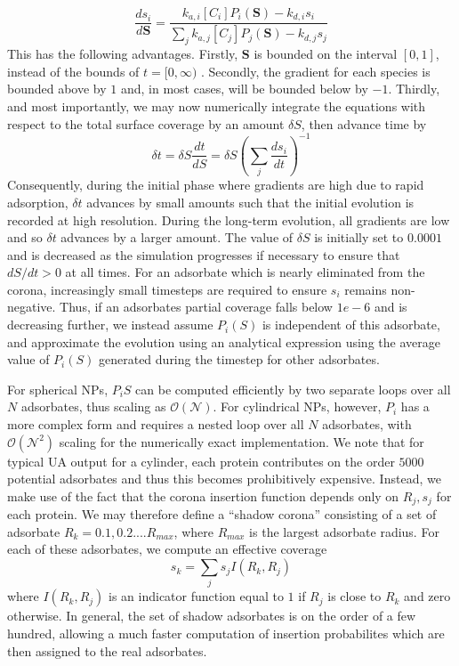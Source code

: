 \documentclass[10pt,a4paper,onecolumn]{report}
\begin{document}
\begin{equation}
\frac{ d s_i}{d \mathbf{S} } =\frac{  k_{a,i} [C_i] P_i(\mathbf{S}) - k_{d,i} s_i }{  \sum_j  k_{a,j} [C_j] P_j(\mathbf{S}) - k_{d,j} s_j  }
\end{equation}
This has the following advantages. Firstly, $\mathbf{S}$ is bounded on the interval $[0,1]$, instead of the bounds of $t = [0,\infty)$ . Secondly, the gradient for each species is bounded above by $1$ and, in most cases, will be bounded below by $-1$. Thirdly, and most importantly, we may now numerically integrate the equations with respect to the total surface coverage by an amount $\delta S$, then advance time by
\begin{equation}
\delta t = \delta S \frac{d t}{d S} = \delta S \left(  \sum_j \frac{d s_i}{dt}  \right)^{-1}
\end{equation}
Consequently, during the initial phase where gradients are high due to rapid adsorption, $\delta t$ advances by small amounts such that the initial evolution is recorded at high resolution. During the long-term evolution, all gradients are low and so $\delta t$ advances by a larger amount. The value of $\delta S$ is initially set to $0.0001$ and is decreased as the simulation progresses if necessary to ensure that $dS/dt > 0$ at all times. 
For an adsorbate which is nearly eliminated from the corona, increasingly small timesteps are required to ensure $s_i$ remains non-negative. Thus, if an adsorbates partial coverage falls below $1e-6$ and is decreasing further, we instead assume $P_i(S)$ is independent of this adsorbate, and approximate the evolution using an analytical expression using the average value of $P_i(S)$ generated during the timestep for other adsorbates.


For spherical NPs, $P_i{S}$ can be computed efficiently by two separate loops over all $N$ adsorbates, thus scaling as $\mathcal{O(N)}$.
For cylindrical NPs, however, $P_i$ has a more complex form and requires a nested loop over all $N$ adsorbates, with $\mathcal{O(N^2)}$ scaling for the numerically exact implementation. We note that for typical UA output for a cylinder, each protein contributes on the order $5000$ potential adsorbates and thus this becomes prohibitively expensive. Instead, we make use of the fact that the corona insertion function depends only on $R_j,s_j$ for each protein.
We may therefore define a ``shadow corona'' consisting of a set of adsorbate $R_k=0.1, 0.2 .... R_{max}$, where $R_{max}$ is the largest adsorbate radius. For each of these adsorbates, we compute an effective coverage
\begin{equation}
s_k = \sum_j s_j I(R_k, R_j)
\end{equation}
 where $I(R_k, R_j)$ is an indicator function equal to $1$ if $R_j$ is close to $R_k$ and zero otherwise. In general, the set of shadow adsorbates is on the order of a few hundred, allowing a much faster computation of insertion probabilites which are then assigned to the real adsorbates.
\end{document}
